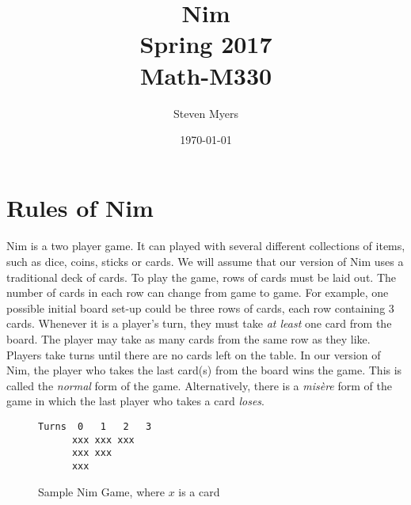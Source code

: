\documentclass{article}
\begin{document}
\title{Nim\\ Spring 2017\\ Math-M330}         %
\author{Steven Myers}        %
\date{\today}          %
\maketitle


\makeatother     %

\pagestyle{plain}

\section*{Rules of Nim}


\paragraph{}
Nim is a two player game. It can played with several different collections of items, such as dice, coins, sticks or cards. We will assume that our version of Nim uses a traditional deck of cards. To play the game, rows of cards must be laid out. The number of cards in each row can change from game to game. For example, one possible initial board set-up could be three rows of cards, each row containing 3 cards. Whenever it is a player's turn, they must take \textit{at least} one card from the board. The player may take as many cards from the same row as they like. Players take turns until there are no cards left on the table. In our version of Nim, the player who takes the last card(s) from the board wins the game. This is called the \textit{normal} form of the game. Alternatively, there is a \textit{mis\`ere} form of the game in which the last player who takes a card \textit{loses}.\\

\begin{figure}[h]
    \center
    \begin{BVerbatim}
Turns  0   1   2   3
      xxx xxx xxx
      xxx xxx
      xxx
    \end{BVerbatim}
    \caption{Sample Nim Game, where $x$ is a card}
\end{figure}
\end{document}
